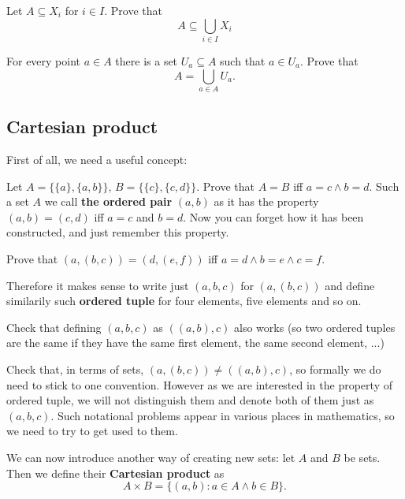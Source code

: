 \begin{exercise}
	Let $A\subseteq X_i$ for $i\in I$. Prove that
	$$A\subseteq \bigcup_{i\in I} X_i$$
\end{exercise}

\begin{exercise}
	For every point $a\in A$ there is a set $U_a\subseteq A$ such that $a\in U_a$.
	Prove that $$A=\bigcup_{a\in A} U_a.$$
\end{exercise}

\subsection{Cartesian product}
First of all, we need a useful concept:
\begin{prob}
	Let $A=\{\{a\}, \{a,b\}\},\, B=\{\{c\},\{c,d\}\}$. Prove that $A=B$ iff $a=c\wedge b=d$. Such a set $A$ we call
	\textbf{the ordered pair} $(a,b)$ as it has the property $(a,b)=(c,d)$ iff $a=c$ and $b=d$.
	Now you can forget how it has been constructed, and just remember this property.
\end{prob}

\begin{prob}
Prove that $(a,(b,c))=(d,(e,f))$ iff $a=d\wedge b=e\wedge c=f$.
\end{prob}
\noindent Therefore it makes sense to write just
$(a,b,c)$ for $(a,(b,c))$ and define similarily such \textbf{ordered tuple} for four elements, five elements
and so on.
\begin{prob}
Check that defining $(a,b,c)$ as $((a,b),c)$ also works (so two ordered tuples are the same if they have the
same first element, the same second element, ...)
\end{prob}
\begin{prob}
Check that, in terms of sets, $(a,(b,c))\neq ((a,b),c)$, so formally we do need to stick to one convention.
However as we are interested in the property of ordered tuple, we will not distinguish them and denote both
of them just as $(a,b,c)$. Such notational problems appear in various places in mathematics, so we need to
try to get used to them.
\end{prob}

\noindent We can now introduce another way of creating new sets: let $A$ and $B$ be sets. Then we define their
\textbf{Cartesian product} as
$$A\times B = \{(a,b) : a\in A\wedge b\in B\}.$$

